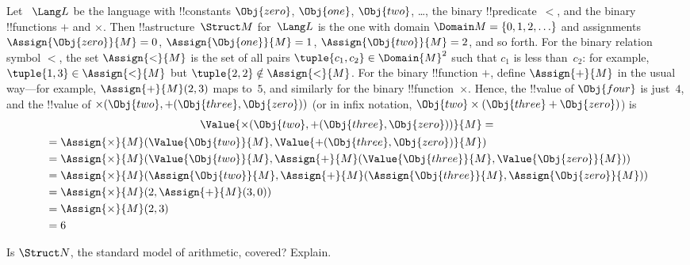 \documentclass[../../../include/open-logic-section]{subfiles}
\begin{document}
\begin{ex}
Let ~$\Lang L$ be the language with !!{constant}s $\Obj{zero}$,
$\Obj{one}$, $\Obj{two}$, \dots, the binary !!{predicate}~$<$, and the
binary !!{function}s $+$ and $\times$. Then !!a{structure}~$\Struct
M$ for~$\Lang L$ is the one with domain $\Domain M = \{0, 1, 2, \ldots
\}$ and assignments $\Assign{\Obj{zero}}{M} = 0$,
$\Assign{\Obj{one}}{M} = 1$, $\Assign{\Obj{two}}{M} = 2$, and so
forth. For the binary relation symbol $<$, the set $\Assign{<}{M}$ is
the set of all pairs $\tuple{c_1, c_2} \in \Domain{M}^2$ such that
$c_1$ is less than~$c_2$: for example, $\tuple{1, 3} \in
\Assign{<}{M}$ but $\tuple{2, 2} \notin \Assign{<}{M}$. For the binary
!!{function} $+$, define $\Assign{+}{M}$ in the usual way---for
example, $\Assign{+}{M}(2,3)$ maps to~$5$, and similarly for the
binary !!{function}~$\times$. Hence, the !!{value} of $\Obj{four}$ is
just~$4$, and the !!{value} of $\times(\Obj{two},
+(\Obj{three},\Obj{zero}))$ (or in infix notation, $\Obj{two} \times
(\Obj{three} + \Obj{zero})$) is
\begin{multline*}
\Value{\times(\Obj{two}, +(\Obj{three},\Obj{zero}))}{M} =\\
\begin{aligned}
& =\Assign{\times}{M}(\Value{\Obj{two}}{M}, \Value{+(\Obj{three}, \Obj{zero})}{M})\\
& = \Assign{\times}{M}(\Value{\Obj{two}}{M}, \Assign{+}{M}(\Value{\Obj{three}}{M},
\Value{\Obj{zero}}{M})) \\
& = \Assign{\times}{M}(\Assign{\Obj{two}}{M}, \Assign{+}{M}(\Assign{\Obj{three}}{M},
\Assign{\Obj{zero}}{M})) \\
& = \Assign{\times}{M}(2, \Assign{+}{M}(3, 0)) \\
& = \Assign{\times}{M}(2, 3) \\
& = 6
\end{aligned}
\end{multline*}
\end{ex}

\begin{prob}
Is $\Struct N$, the standard model of arithmetic, covered? Explain.
\end{prob}
\end{document}
